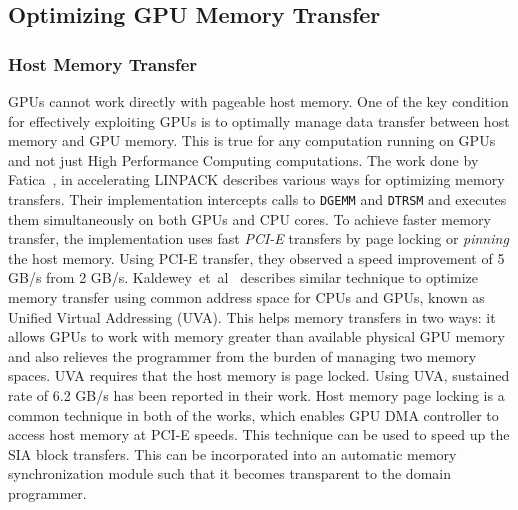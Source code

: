 \subsection{Optimizing GPU Memory Transfer}
\subsubsection{Host Memory Transfer}
GPUs cannot work directly with pageable host memory. One of the key condition for
effectively exploiting GPUs is to optimally manage data transfer between host memory
and GPU memory. This is true for any computation running on GPUs and not just High
Performance Computing computations. The work done by Fatica~\cite{Fatica:2009:ALC:1513895.1513901},
in accelerating LINPACK describes various ways for optimizing memory transfers. Their
implementation intercepts calls to \texttt{DGEMM} and \texttt{DTRSM} and executes them simultaneously
on both GPUs and CPU cores. To achieve faster memory transfer, the implementation uses fast
\textit{PCI-E} transfers by page locking or \textit{pinning} the host memory. Using
PCI-E transfer, they observed a speed improvement of 5 GB/s from 2 GB/s.
Kaldewey~et~al~\cite{Kaldewey:2012:GJP:2236584.2236592} describes similar technique
to optimize memory transfer using common address space for CPUs and GPUs, known as
Unified Virtual Addressing (UVA). This helps memory transfers in two ways: it
allows GPUs to work with memory greater than available physical GPU memory and also relieves
the programmer from the burden of managing two memory spaces. UVA requires that the
host memory is page locked. Using UVA, sustained rate of 6.2 GB/s has been reported in their work.
Host memory page locking is a common technique in both of the works, which enables GPU DMA controller
to access host memory at PCI-E speeds. This technique can be used to speed up the
SIA block transfers. This can be incorporated into an automatic memory synchronization module
such that it becomes transparent to the domain programmer.

